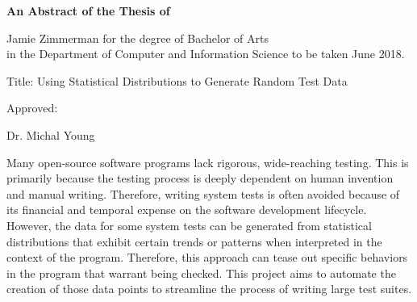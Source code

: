 
\begin{center}

\normalsize \textbf {An Abstract of the Thesis of}

Jamie Zimmerman for the degree of Bachelor of Arts \\
in the Department of Computer and Information Science to be taken June 2018.

\vspace{2cm}


Title: Using Statistical Distributions to Generate Random Test Data

\vspace{1.5cm}

Approved: \hrulefill

Dr. Michal Young

\vspace{1cm}

\end{center}
\setlength{\parindent}{0.5cm}
\indent\indent Many open-source software programs lack rigorous, wide-reaching testing. This is primarily because the testing process is deeply dependent on human invention and manual writing. Therefore, writing system tests is often avoided because of its financial and temporal expense on the software development lifecycle. However, the data for some system tests can be generated from statistical distributions that exhibit certain trends or patterns when interpreted in the context of the program. Therefore, this approach can tease out specific behaviors in the program that warrant being checked. This project aims to automate the creation of those data points to streamline the process of writing large test suites.
